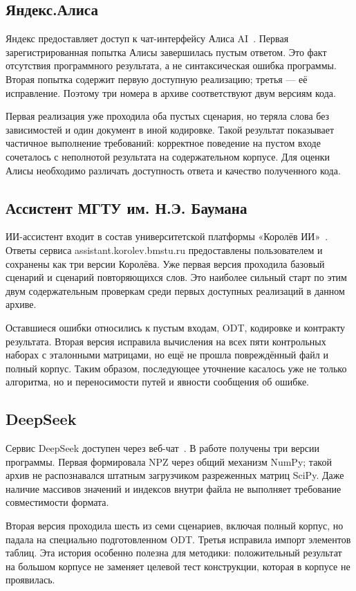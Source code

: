 \subsection{Яндекс.Алиса}
Яндекс предоставляет доступ к чат-интерфейсу Алиса AI~\cite{alice}. Первая зарегистрированная попытка Алисы завершилась пустым ответом. Это факт отсутствия программного результата, а не синтаксическая ошибка программы. Вторая попытка содержит первую доступную реализацию; третья — её исправление. Поэтому три номера в архиве соответствуют двум версиям кода.

Первая реализация уже проходила оба пустых сценария, но теряла слова без зависимостей и один документ в иной кодировке. Такой результат показывает частичное выполнение требований: корректное поведение на пустом входе сочеталось с неполнотой результата на содержательном корпусе. Для оценки Алисы необходимо различать доступность ответа и качество полученного кода.

\subsection{Ассистент МГТУ им. Н.Э. Баумана}
ИИ-ассистент входит в состав университетской платформы «Королёв ИИ»~\cite{korolev}. Ответы сервиса assistant.korolev.bmstu.ru предоставлены пользователем и сохранены как три версии Королёва. Уже первая версия проходила базовый сценарий и сценарий повторяющихся слов. Это наиболее сильный старт по этим двум содержательным проверкам среди первых доступных реализаций в данном архиве.

Оставшиеся ошибки относились к пустым входам, ODT, кодировке и контракту результата. Вторая версия исправила вычисления на всех пяти контрольных наборах с эталонными матрицами, но ещё не прошла повреждённый файл и полный корпус. Таким образом, последующее уточнение касалось уже не только алгоритма, но и переносимости путей и явности сообщения об ошибке.

\subsection{DeepSeek}
Сервис DeepSeek доступен через веб-чат~\cite{deepseek}. В работе получены три версии программы. Первая формировала NPZ через общий механизм NumPy; такой архив не распознавался штатным загрузчиком разреженных матриц SciPy. Даже наличие массивов значений и индексов внутри файла не выполняет требование совместимости формата.

Вторая версия проходила шесть из семи сценариев, включая полный корпус, но падала на специально подготовленном ODT. Третья исправила импорт элементов таблиц. Эта история особенно полезна для методики: положительный результат на большом корпусе не заменяет целевой тест конструкции, которая в корпусе не проявилась.

